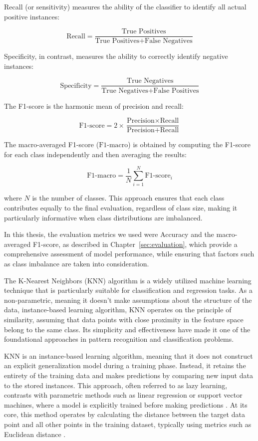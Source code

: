 \documentclass{article}
\begin{document}
Recall (or sensitivity) measures the ability of the classifier to identify all actual positive instances:

\[
\text{Recall} = \frac{\text{True Positives}}{\text{True Positives} + \text{False Negatives}}
\]

Specificity, in contrast, measures the ability to correctly identify negative instances:

\[
\text{Specificity} = \frac{\text{True Negatives}}{\text{True Negatives} + \text{False Positives}}
\]

The F1-score is the harmonic mean of precision and recall:

\[
\text{F1-score} = 2 \times \frac{\text{Precision} \times \text{Recall}}{\text{Precision} + \text{Recall}}
\]

The macro-averaged F1-score (\(\text{F1-macro}\)) is obtained by computing the F1-score for each class independently and then averaging the results:

\[
\text{F1-macro} = \frac{1}{N} \sum_{i=1}^{N} \text{F1-score}_i
\]

where \(N\) is the number of classes. This approach ensures that each class contributes equally to the final evaluation, regardless of class size, making it particularly informative when class distributions are imbalanced.

In this thesis, the evaluation metrics we used were Accuracy and the macro-averaged F1-score, as described in Chapter~\ref{sec:evaluation}, which provide a comprehensive assessment of model performance, while ensuring that factors such as class imbalance are taken into consideration.

The K-Nearest Neighbors (KNN) algorithm is a widely utilized machine learning technique that is particularly suitable for classification and regression tasks. As a non-parametric, meaning it doesn't make assumptions about the structure of the data, instance-based learning algorithm, KNN operates on the principle of similarity, assuming that data points with close proximity in the feature space belong to the same class. Its simplicity and effectiveness have made it one of the foundational approaches in pattern recognition and classification problems.

KNN is an instance-based learning algorithm, meaning that it does not construct an explicit generalization model during a training phase. Instead, it retains the entirety of the training data and makes predictions by comparing new input data to the stored instances. This approach, often referred to as lazy learning, contrasts with parametric methods such as linear regression or support vector machines, where a model is explicitly trained before making predictions \cite{gavagsaz2022}. At its core, this method operates by calculating the distance between the target data point and all other points in the training dataset, typically using metrics such as Euclidean distance \cite{sinulingga2023}.
\end{document}
